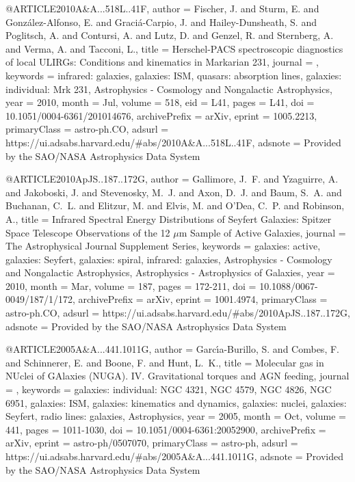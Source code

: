 \documentclass[longauth]{aa}
\begin{document}
@ARTICLE{2010A&A...518L..41F,
       author = {{Fischer}, J. and {Sturm}, E. and {Gonz{\'a}lez-Alfonso}, E. and {Graci{\'a}-Carpio}, J. and {Hailey-Dunsheath}, S. and {Poglitsch}, A. and {Contursi}, A. and {Lutz}, D. and {Genzel}, R. and {Sternberg}, A. and {Verma}, A. and {Tacconi}, L.},
        title = {Herschel-PACS spectroscopic diagnostics of local ULIRGs: Conditions and kinematics in Markarian 231},
      journal = {\aap},
     keywords = {infrared: galaxies, galaxies: ISM, quasars: absorption lines, galaxies:
        individual: Mrk 231, Astrophysics - Cosmology and Nongalactic
        Astrophysics},
         year = 2010,
        month = Jul,
       volume = {518},
          eid = {L41},
        pages = {L41},
          doi = {10.1051/0004-6361/201014676},
archivePrefix = {arXiv},
       eprint = {1005.2213},
 primaryClass = {astro-ph.CO},
       adsurl = {https://ui.adsabs.harvard.edu/#abs/2010A&A...518L..41F},
      adsnote = {Provided by the SAO/NASA Astrophysics Data System}
}

@ARTICLE{2010ApJS..187..172G,
       author = {{Gallimore}, J.~F. and {Yzaguirre}, A. and {Jakoboski}, J. and {Stevenosky}, M.~J. and {Axon}, D.~J. and {Baum}, S.~A. and {Buchanan}, C.~L. and {Elitzur}, M. and {Elvis}, M. and {O'Dea}, C.~P. and {Robinson}, A.},
       title = {Infrared Spectral Energy Distributions of Seyfert Galaxies: Spitzer Space Telescope Observations of the 12 {\ensuremath{\mu}}m Sample of Active Galaxies},
      journal = {The Astrophysical Journal Supplement Series},
     keywords = {galaxies: active, galaxies: Seyfert, galaxies: spiral, infrared: galaxies, Astrophysics - Cosmology and Nongalactic Astrophysics, Astrophysics - Astrophysics of Galaxies},
         year = 2010,
        month = Mar,
       volume = {187},
        pages = {172-211},
          doi = {10.1088/0067-0049/187/1/172},
archivePrefix = {arXiv},
       eprint = {1001.4974},
 primaryClass = {astro-ph.CO},
       adsurl = {https://ui.adsabs.harvard.edu/#abs/2010ApJS..187..172G},
      adsnote = {Provided by the SAO/NASA Astrophysics Data System}
}

@ARTICLE{2005A&A...441.1011G,
       author = {{Garc{\'\i}a-Burillo}, S. and {Combes}, F. and {Schinnerer}, E. and {Boone}, F. and {Hunt}, L.~K.},
        title = {Molecular gas in NUclei of GAlaxies (NUGA). IV. Gravitational torques and AGN feeding},
      journal = {\aap},
     keywords = {galaxies: individual: NGC 4321, NGC 4579, NGC 4826, NGC 6951, galaxies: ISM, galaxies: kinematics and dynamics, galaxies: nuclei, galaxies: Seyfert, radio lines: galaxies, Astrophysics},
         year = 2005,
        month = Oct,
       volume = {441},
        pages = {1011-1030},
          doi = {10.1051/0004-6361:20052900},
archivePrefix = {arXiv},
       eprint = {astro-ph/0507070},
 primaryClass = {astro-ph},
       adsurl = {https://ui.adsabs.harvard.edu/#abs/2005A&A...441.1011G},
      adsnote = {Provided by the SAO/NASA Astrophysics Data System}
}
\end{document}
